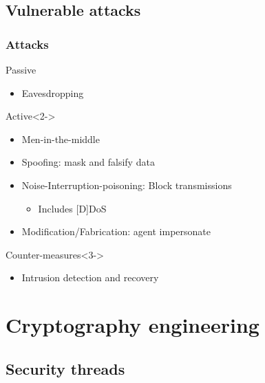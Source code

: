 \documentclass{beamer}
\begin{document}

\subsection{Vulnerable attacks}

\begin{frame}
\frametitle{Attacks}
    \begin{block}{Passive}
        \begin{itemize}
            \item Eavesdropping
        \end{itemize}
    \end{block}
    \begin{block}{Active}<2->
        \begin{itemize}
            \item Men-in-the-middle
            \item Spoofing: mask and falsify data
            \item Noise-Interruption-poisoning: Block transmissions
            \begin{itemize}
                \item Includes [D]DoS
            \end{itemize}
            \item Modification/Fabrication: agent impersonate
        \end{itemize}
    \end{block}
    \begin{block}{Counter-measures}<3->
        \begin{itemize}
            \item Intrusion detection and recovery
        \end{itemize}
    \end{block}
\end{frame}

\section{Cryptography engineering}

\subsection{Security threads}
\end{document}
